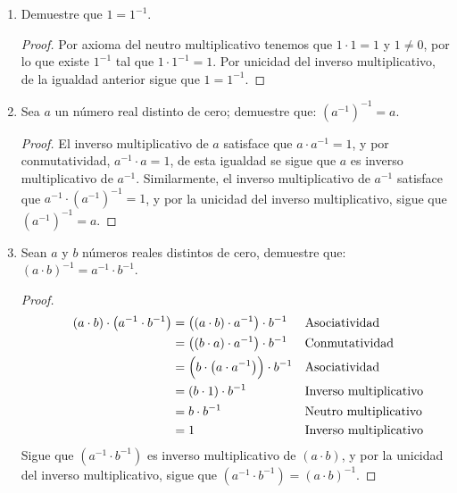 \documentclass[11pt]{article}
\begin{document}
\begin{enumerate}[label=\alph*)]
    \item Demuestre que $1=1^{-1}$.
    \vspace{-1em}\begin{proof} 
        Por axioma del neutro multiplicativo tenemos que $1\cdot 1 = 1$ y $1\neq 0$, por lo que existe $1^{-1}$ tal que $1 \cdot 1^{-1}=1$. Por unicidad del inverso multiplicativo, de la igualdad anterior sigue que $1=1^{-1}$.
    \end{proof} \vspace{-1em}

    \item Sea $a$ un número real distinto de cero; demuestre que: $\left( a^{-1} \right)^{-1}=a$.
    
    \vspace{-1em}\begin{proof} 
        El inverso multiplicativo de $a$ satisface que $a\cdot a^{-1}=1$, y por conmutatividad, $a^{-1} \cdot a=1$, de esta igualdad se sigue que $a$ es inverso multiplicativo de $a^{-1}$. Similarmente, el inverso multiplicativo de $a^{-1}$ satisface que $ a^{-1} \cdot \left( a^{-1} \right)^{-1} =1$, y por la unicidad del inverso multiplicativo, sigue que $\left( a^{-1} \right)^{-1}=a$.  
    \end{proof} \vspace{-1em}

\pagebreak
    
    \item Sean $a$ y $b$ números reales distintos de cero, demuestre que: $(a \cdot b)^{-1}=a^{-1} \cdot b^{-1}$.
    \vspace{-1em}\begin{proof} 
        \begin{align*}
        && \quad \left(a \cdot b \right) \cdot  \left(a^{-1} \cdot b^{-1}  \right)	&=	 \left( \left(a \cdot b\right) \cdot a^{-1}  \right) \cdot b^{-1}  	&& \text{Asociatividad}\\
        && \quad &=	 \left( \left(b\cdot a \right) \cdot a^{-1}  \right) \cdot b^{-1}  	&& \text{Conmutatividad}\\
        && \quad &=	 \Bigl(b\cdot  \left(a \cdot a^{-1}\right) \Bigr) \cdot b^{-1}	&& \text{Asociatividad}\\
        && \quad &=	 \left(b\cdot 1 \right) \cdot b^{-1}	&& \text{Inverso multiplicativo}\\
        && \quad &=	b\cdot b^{-1}	&& \text{Neutro multiplicativo}\\
        && \quad &=	1	&& \text{Inverso multiplicativo}
        \end{align*}
        Sigue que $\left(a^{-1} \cdot b^{-1} \right)$ es inverso multiplicativo de $\left( a \cdot b\right)$, y por la unicidad del inverso multiplicativo, sigue que $\left(a^{-1} \cdot b^{-1} \right) = \left( a \cdot b\right)^{-1}$.    
    \end{proof} \vspace{-1em}
    

\end{enumerate}
\end{document}
